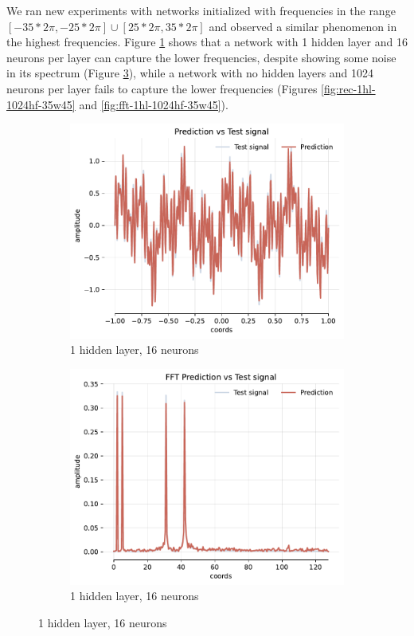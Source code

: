 We ran new experiments with networks initialized with frequencies in the range $[-35*2\pi, -25*2\pi] \cup [25*2\pi, 35*2\pi]$ and observed a similar phenomenon in the highest frequencies. Figure \ref{fig:rec-1hl-16hf-35w45} shows that a network with 1 hidden layer and 16 neurons per layer can capture the lower frequencies, despite showing some noise in its spectrum (Figure \ref{fig:fft-1hl-16hf-35w45}), while a network with no hidden layers and 1024 neurons per layer fails to capture the lower frequencies (Figures \ref{fig:rec-1hl-1024hf-35w45} and \ref{fig:fft-1hl-1024hf-35w45}).

\begin{figure}
    \centering
    \begin{subfigure}[b]{0.40\textwidth}
        \centering
        \includegraphics[width=\textwidth]{img/ch3/prediction_1hl_16hf_35w45.pdf}
        \caption{1 hidden layer, 16 neurons}
        \label{fig:rec-1hl-16hf-35w45}
    \end{subfigure}
    \begin{subfigure}[b]{0.40\textwidth}
        \centering
        \includegraphics[width=\textwidth]{img/ch3/fft_1hl_16hf_35w45.pdf}
        \caption{1 hidden layer, 16 neurons}
        \label{fig:fft-1hl-16hf-35w45}
    \end{subfigure}
    

\end{figure}
